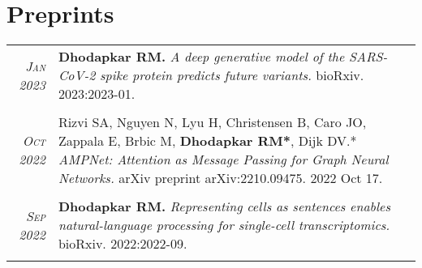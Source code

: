 \documentclass[a4paper,10pt]{article}
\begin{document}
\section{Preprints}
\begin{tabular}{rp{11cm}}
 \textit{\textsc{Jan} 2023}& {\bf Dhodapkar RM.} {\it A deep generative model of the SARS-CoV-2 spike protein predicts future variants.} bioRxiv. 2023:2023-01. \\
\multicolumn{2}{c}{} \\
 \textit{\textsc{Oct} 2022}& Rizvi SA, Nguyen N, Lyu H, Christensen B, Caro JO, Zappala E, Brbic M, {\bf Dhodapkar RM*}, Dijk DV.* {\it AMPNet: Attention as Message Passing for Graph Neural Networks.} arXiv preprint arXiv:2210.09475. 2022 Oct 17.
 \\
\multicolumn{2}{c}{} \\
 \textit{\textsc{Sep} 2022}& {\bf Dhodapkar RM.} {\it Representing cells as sentences enables natural-language processing for single-cell transcriptomics.} bioRxiv. 2022:2022-09.
 \\
\multicolumn{2}{c}{}
\end{tabular}

\end{document}

